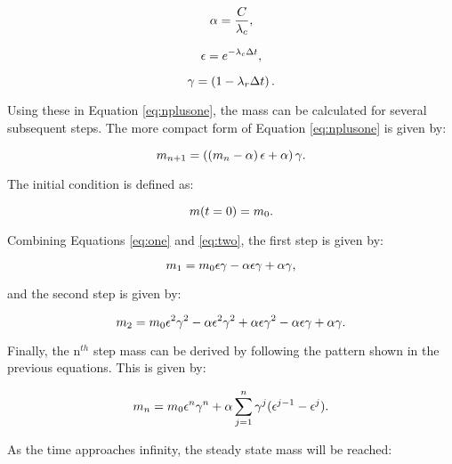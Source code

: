 \begin{equation} \hfill
\alpha = \frac{C}{\lambda_c},
\hfill \end{equation}

\begin{equation} \hfill
\epsilon = e^{-\lambda_c \Delta t},
\hfill \end{equation}

\begin{equation} \hfill
\gamma = \left(1 - {\lambda_r \Delta t} \right).
\hfill \end{equation}

Using these in Equation \eqref{eq:nplusone}, the mass can be calculated for several subsequent steps.
The more compact form of Equation \eqref{eq:nplusone} is given by:

\begin{equation} \hfill
m_{n+1} = \left(\left(m_n - \alpha \right) \epsilon  + \alpha\right) \gamma.
\hfill \label{eq:one} \end{equation}

The initial condition is defined as:

\begin{equation} \hfill
m(t=0) = m_0.
\hfill \label{eq:two} \end{equation}

Combining Equations \eqref{eq:one} and \eqref{eq:two}, the first step is given by:

\begin{equation} \hfill
m_1 = m_0 \epsilon \gamma - \alpha \epsilon \gamma + \alpha \gamma,
\hfill \end{equation}

and the second step is given by:

\begin{equation} \hfill
m_2 = m_0 \epsilon^2 \gamma^2 - \alpha \epsilon^2 \gamma^2 + \alpha \epsilon \gamma^2 - \alpha \epsilon \gamma + \alpha \gamma.
\hfill \end{equation}

Finally, the n$^{th}$ step mass can be derived by following the pattern shown in the previous equations.
This is given by:

\begin{equation} \hfill
m_n = m_0 \epsilon^n \gamma^n + \alpha \sum_{j=1}^n \gamma^j (\epsilon^{j-1} - \epsilon^j).
\hfill \end{equation}

As the time approaches infinity, the steady state mass will be reached:

